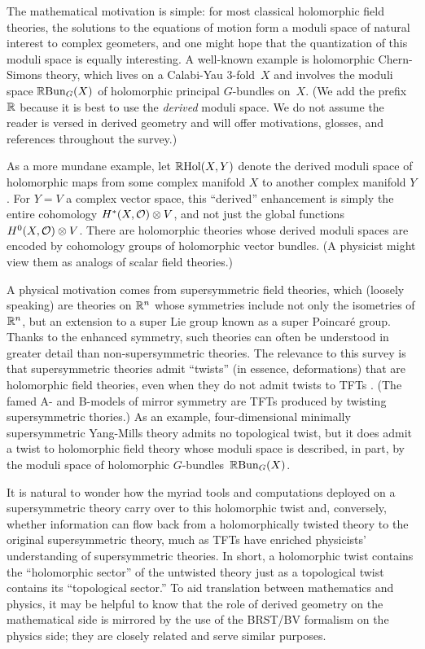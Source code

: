 \documentclass[11pt]{amsart}
\begin{document}
The mathematical motivation is simple:
for most classical holomorphic field theories, the solutions to the equations of motion form a moduli space of natural interest to complex geometers,
and one might hope that the quantization of this moduli space is equally interesting.
A well-known example is holomorphic Chern-Simons theory,
which lives on a Calabi-Yau 3-fold~$X$ and involves the moduli space $\mathbb R{\rm Bun}_G(X)$ of holomorphic principal $G$-bundles on~$X$.
(We add the prefix $\mathbb R$ because it is best to use the {\em derived} moduli space.
We do not assume the reader is versed in derived geometry and will offer motivations, glosses, and references throughout the survey.)

As a more mundane example, let $\mathbb R{\rm Hol}(X,Y)$ denote the derived moduli space of holomorphic maps from some complex manifold $X$ to another complex manifold $Y$.
For $Y = V$ a complex vector space, this ``derived'' enhancement is simply the entire  cohomology $H^*(X, \mathcal O) \otimes V$, and not just the global functions $H^0(X,\mathcal O) \otimes V$.
There are holomorphic theories whose derived moduli spaces are encoded by cohomology groups of holomorphic vector bundles.
(A physicist might view them as analogs of scalar field theories.)

A physical motivation comes from supersymmetric field theories, 
which (loosely speaking) are theories on $\mathbb R^n$ whose symmetries include not only the isometries of $\mathbb R^n$, but an extension to a super Lie group known as a super Poincar\'e group.
Thanks to the enhanced symmetry, such theories can often be understood in greater detail than non-supersymmetric theories.
The relevance to this survey is that supersymmetric theories admit ``twists'' (in essence, deformations) that are holomorphic field theories, 
even when they do not admit twists to TFTs \cite{CosSUSY}. 
(The famed A- and B-models of mirror symmetry are TFTs produced by twisting supersymmetric thories.)
As an example, four-dimensional minimally supersymmetric Yang-Mills theory admits no topological twist, 
but it does admit a twist to holomorphic field theory whose moduli space is described, in part, by the moduli space of holomorphic $G$-bundles~$\mathbb R {\rm Bun}_G(X)$. 

It is natural to wonder how the myriad tools and computations deployed on a supersymmetric theory carry over to this holomorphic twist 
and, conversely, whether information can flow back from a holomorphically twisted theory to the original supersymmetric theory, 
much as TFTs have enriched physicists' understanding of supersymmetric theories.
In short, a holomorphic twist contains the ``holomorphic sector'' of the untwisted theory just as a topological twist contains its ``topological sector.''
To aid translation between mathematics and physics, 
it may be helpful to know that the role of derived geometry on the mathematical side is mirrored by the use of the BRST/BV formalism on the physics side;
they are closely related and serve similar purposes.
\end{document}
